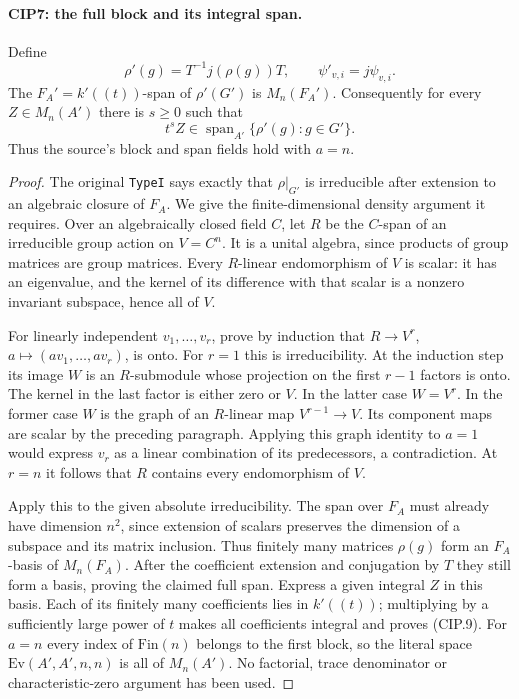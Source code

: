 \paragraph{CIP7: the full block and its integral span.}
\label{claim:CIP7}
Define
\[
 \rho'(g)=T^{-1}j(\rho(g))T,\qquad
 \psi'_{v,i}=j\psi_{v,i}.                            \tag{CIP.8}
\]
The $F_A'=k'((t))$-span of $\rho'(G')$ is
$M_n(F_A')$.  Consequently for every $Z\in M_n(A')$ there is
$s\ge0$ such that
\[
 t^s Z\in\operatorname{span}_{A'}\{\rho'(g):g\in G'\}.
 \tag{CIP.9}
\]
Thus the source's block and span fields hold with $a=n$.
\begin{proof}
The original \texttt{TypeI} says exactly that $\rho|_{G'}$ is
irreducible after extension to an algebraic closure of $F_A$.
We give the finite-dimensional density argument it requires.
Over an algebraically closed field $C$, let $R$ be the $C$-span
of an irreducible group action on $V=C^n$.  It is a unital algebra,
since products of group matrices are group matrices.  Every
$R$-linear endomorphism of $V$ is scalar: it has an eigenvalue,
and the kernel of its difference with that scalar is a nonzero
invariant subspace, hence all of $V$.

For linearly independent $v_1,\ldots,v_r$, prove by induction that
$R\to V^r$, $a\mapsto(av_1,\ldots,av_r)$, is onto.  For $r=1$
this is irreducibility.  At the induction step its image $W$ is
an $R$-submodule whose projection on the first $r-1$ factors is
onto.  The kernel in the last factor is either zero or $V$.
In the latter case $W=V^r$.  In the former case $W$ is the graph
of an $R$-linear map $V^{r-1}\to V$.  Its component maps are scalar
by the preceding paragraph.  Applying this graph identity to
$a=1$ would express $v_r$ as a linear combination of its
predecessors, a contradiction.  At $r=n$ it follows that $R$
contains every endomorphism of $V$.

Apply this to the given absolute irreducibility.  The span over
$F_A$ must already have dimension $n^2$, since extension of scalars
preserves the dimension of a subspace and its matrix inclusion.
Thus finitely many matrices $\rho(g)$ form an $F_A$-basis of
$M_n(F_A)$.  After the coefficient extension and conjugation by
$T$ they still form a basis, proving the claimed full span.
Express a given integral $Z$ in this basis.  Each of its finitely
many coefficients lies in $k'((t))$; multiplying by a sufficiently
large power of $t$ makes all coefficients integral and proves
(CIP.9).  For $a=n$ every index of $\mathrm{Fin}(n)$ belongs to
the first block, so the literal space
$\mathrm{Ev}(A',A',n,n)$ is all of $M_n(A')$.
No factorial, trace denominator or characteristic-zero argument
has been used.
\end{proof}

